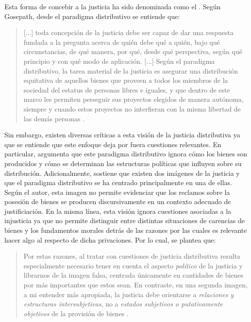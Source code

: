 Esta forma de concebir a la justicia ha sido denominada como el  \citep{Gosepath_2013}. Según Gosepath, desde el paradigma distributivo se entiende que:

\vspace{3mm}
\begin{quote}
    [...] toda concepción de la justicia debe ser capaz de dar una respuesta fundada a la pregunta acerca de quién debe qué a quién, bajo qué circunstancias, de qué manera, por qué, desde qué perspectiva, según qué principio y con qué modo de aplicación. [...] Según el paradigma distributivo, la tarea material de la justicia es asegurar una distribución equitativa de aquellos bienes que proveen a todos los miembros de la sociedad del estatus de personas libres e iguales, y que dentro de este marco les permiten perseguir sus proyectos elegidos de manera autónoma, siempre y cuando estos proyectos no interfieran con la misma libertad de las demás personas \citep[p. 48]{Gosepath_2013}.
\end{quote}
\vspace{3mm}

Sin embargo, existen diversas críticas a esta visión de la justicia distributiva ya que se entiende que este enfoque deja por fuera cuestiones relevantes. En particular, \citet{Young_2000} argumenta que este paradigma distributivo ignora cómo los bienes son producidos y cómo se determinan las estructuras políticas que influyen sobre su distribución. Adicionalmente, \citet{Forst_2013} sostiene que existen dos imágenes de la justicia y que el paradigma distributivo se ha centrado principalmente en una de ellas. Según el autor, esta imagen no permite evidenciar que los reclamos sobre la posesión de bienes se producen discursivamente en un contexto adecuado de justificiación. En la misma línea, esta visión ignora cuestiones asociadas a la injusticia ya que no permite distinguir entre distintas situaciones de carencias de bienes y los fundamentos morales detrás de las razones por las cuales es relevante hacer algo al respecto de dicha privaciones. Por lo cual, se plantea que:

\vspace{3mm}
\begin{quote}
    Por estas razones, al tratar con cuestiones de justicia distributiva resulta especialmente necesario tener en cuenta el aspecto \textit{político} de la justicia y librarnos de la imagen falsa, centrada únicamente en cantidades de bienes por más importantes que estos sean. En contraste, en una segunda imagen, a mi entender más apropiada, la justicia debe orientarse a \textit{relaciones y estructuras intersubjetivas}, no a \textit{estados subjetivos o putativamente objetivos} de la provisión de bienes \citep[p. 31]{Forst_2013}.
\end{quote}
\vspace{3mm}

